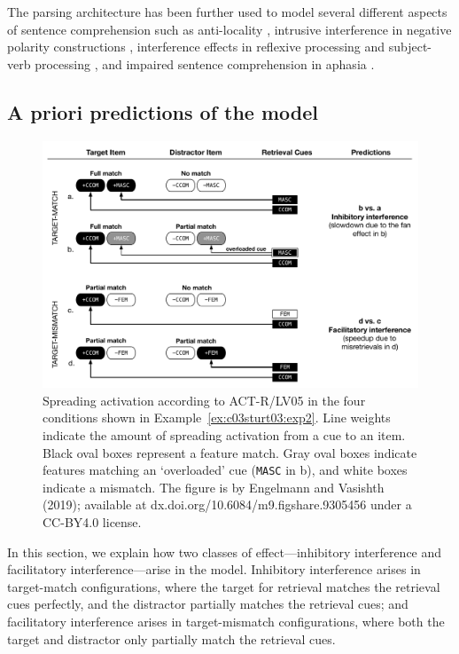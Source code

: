 \documentclass{cambridge7A}\usepackage[]{graphicx}\usepackage[]{color}
\newcommand{\actrcue}[1]{\texttt{\uppercase{#1}}}
\begin{document}
The  parsing architecture has been further used to model several different aspects of sentence comprehension such as  anti-locality \citep{VasishthLewis2006},  intrusive interference in negative polarity constructions \citep{VasishthBruessowLewis2008}, interference effects in reflexive processing \citep{PatilVasishthLewis2012,ParkerPhillips2014,JaegerEngelmannVasishth2015} and subject-verb processing
\citep{WagersLauPhillips2009,DillonMishlerSloggett2013}, and impaired sentence comprehension in aphasia \citep{PatilEtAl2016,MaetzigEtAltopics2018,LissonEtAl2020}.

\subsection{A priori predictions of the model} \label{lv05predictions}

\begin{figure}[!htbp]
\includegraphics[width=\textwidth]{figures/tableLV05pred}
    \caption{Spreading activation according to ACT-R/LV05 in the four conditions shown in Example~\ref{ex:c03sturt03:exp2}. Line weights indicate the amount of  spreading activation from a cue to an item. Black oval boxes represent a feature match. Gray oval boxes indicate features matching an  `overloaded' cue (\actrcue{MASC} in b), and white boxes indicate a mismatch. The figure is by Engelmann and Vasishth (2019); available at dx.doi.org/10.6084/m9.figshare.9305456 under a CC-BY4.0 license.}\label{fig:c03ACTRpred}
\end{figure}

In this section, we explain how two classes of effect---inhibitory interference and facilitatory interference---arise in the model. Inhibitory interference
 arises in target-match configurations, where the target for retrieval matches the retrieval cues perfectly, and the distractor partially matches the retrieval cues; and facilitatory interference
 arises in target-mismatch configurations, where both the target and distractor only partially match the retrieval cues.
\end{document}
